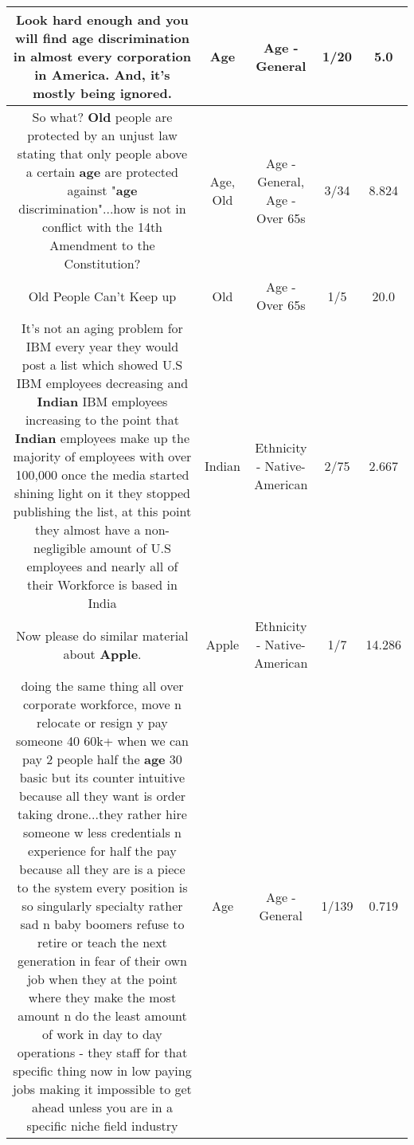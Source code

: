 \documentclass[11pt]{article}
\newlength\mylength
\begin{document}
\begin{center}
\begin{longtable}{|C{.65\mylength}|C{.30\mylength}|C{.12\mylength}|C{.12\mylength}|C{.12\mylength}|}
  \small Look hard enough and you will find \textbf{age} discrimination in almost every corporation in America. And, it's mostly being ignored.\normalsize   & Age & Age - General & 1/20 & 5.0 \\  \hline
  \small So what? \textbf{Old} people are protected by an unjust law stating that only people above a certain \textbf{age} are protected against "\textbf{age} discrimination"...how is not in conflict with the 14th Amendment to the Constitution?\normalsize   & Age, Old & Age - General, Age - Over 65s & 3/34 & 8.824 \\  \hline
  \small Old People Can't Keep up\normalsize   & Old & Age - Over 65s & 1/5 & 20.0 \\  \hline
  \small It's not an aging problem for IBM every year they would post a list which showed U.S IBM employees decreasing and \textbf{Indian} IBM employees increasing to the point that \textbf{Indian} employees make up the majority of employees with over 100,000 once the media started shining light on it they stopped publishing the list, at this point they almost have a non-negligible amount of U.S employees and nearly all of their Workforce is based in India\normalsize   & Indian & Ethnicity - Native-American & 2/75 & 2.667 \\  \hline
  \small Now please do similar material about \textbf{Apple}.\normalsize   & Apple & Ethnicity - Native-American & 1/7 & 14.286 \\  \hline
  \small doing the same thing all over corporate workforce, move n relocate or resign y pay someone \@ 40 60k+ when we can pay 2 people half the \textbf{age} 30 basic but its counter intuitive because all they want is order taking drone...they rather hire someone w less credentials n experience for half the pay because all they are is a piece to the system every position is so singularly specialty rather sad n baby boomers refuse to retire or teach the next generation in fear of their own job when they at the point where they make the most amount n do the least amount of work in day to day operations - they staff for that specific thing now in low paying jobs making it impossible to get ahead unless you are in a specific niche field industry\normalsize   & Age & Age - General & 1/139 & 0.719 \\  \hline

\end{longtable}
\end{center}
\end{document}
